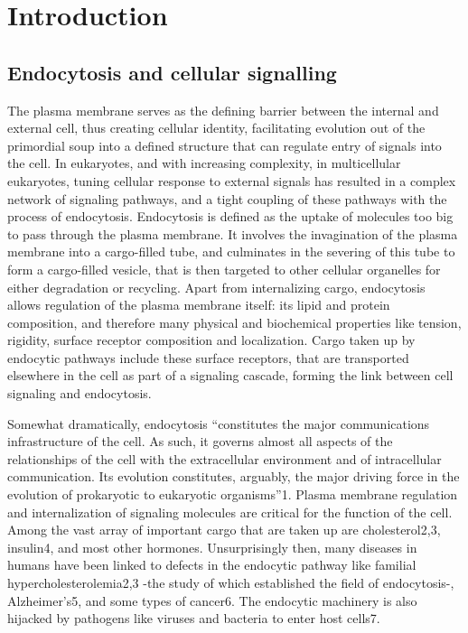 \chapter{Introduction} %

\label{Ch:Aims} %

\section{Endocytosis and cellular signalling}
The plasma membrane serves as the defining barrier between the internal and external cell, thus creating cellular identity, facilitating evolution out of the primordial soup into a defined structure that can regulate entry of signals into the cell. In eukaryotes, and with increasing complexity, in multicellular eukaryotes, tuning cellular response to external signals has resulted in a complex network of signaling pathways, and a tight coupling of these pathways with the process of endocytosis. Endocytosis is defined as the uptake of molecules too big to pass through the plasma membrane. It involves the invagination of the plasma membrane into a cargo-filled tube, and culminates in the severing of this tube to form a cargo-filled vesicle, that is then targeted to other cellular organelles for either degradation or recycling. Apart from internalizing cargo, endocytosis allows regulation of the plasma membrane itself: its lipid and protein composition, and therefore many physical and biochemical properties like tension, rigidity, surface receptor composition and localization. Cargo taken up by endocytic pathways include these surface receptors, that are transported elsewhere in the cell as part of a signaling cascade, forming the link between cell signaling and endocytosis.

\vspace{5mm}
Somewhat dramatically, endocytosis “constitutes the major communications infrastructure of the cell. As such, it governs almost all aspects of the relationships of the cell with the extracellular environment and of intracellular communication. Its evolution constitutes, arguably, the major driving force in the evolution of prokaryotic to eukaryotic organisms”1.  Plasma membrane regulation and internalization of signaling molecules are critical for the function of the cell. Among the vast array of important cargo that are taken up are cholesterol2,3, insulin4, and most other hormones. Unsurprisingly then, many diseases in humans have been linked to defects in the endocytic pathway like familial hypercholesterolemia2,3 -the study of which established the field of endocytosis-, Alzheimer’s5, and some types of cancer6. The endocytic machinery is also hijacked by pathogens like viruses and bacteria to enter host cells7. 

